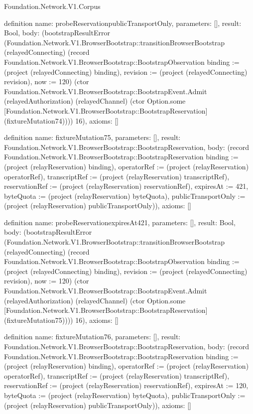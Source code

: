 \begin{lexlean}{Foundation.Network.V1.Corpus}
\begin{semanticmodule}
definition{
  name: probeReservationpublicTransportOnly,
  parameters: [],
  result: Bool,
  body: (bootstrapResultError (Foundation.Network.V1.BrowserBootstrap::transitionBrowserBootstrap (relayedConnecting) (record Foundation.Network.V1.BrowserBootstrap::BootstrapObservation {binding := (project (relayedConnecting) binding), revision := (project (relayedConnecting) revision), now := 120}) (ctor Foundation.Network.V1.BrowserBootstrap::BootstrapEvent.Admit (relayedAuthorization) (relayedChannel) (ctor Option.some [Foundation.Network.V1.BrowserBootstrap::BootstrapReservation] (fixtureMutation74)))) 16),
  axioms: []
}

definition{
  name: fixtureMutation75,
  parameters: [],
  result: Foundation.Network.V1.BrowserBootstrap::BootstrapReservation,
  body: (record Foundation.Network.V1.BrowserBootstrap::BootstrapReservation {binding := (project (relayReservation) binding), operatorRef := (project (relayReservation) operatorRef), transcriptRef := (project (relayReservation) transcriptRef), reservationRef := (project (relayReservation) reservationRef), expiresAt := 421, byteQuota := (project (relayReservation) byteQuota), publicTransportOnly := (project (relayReservation) publicTransportOnly)}),
  axioms: []
}

definition{
  name: probeReservationexpiresAt421,
  parameters: [],
  result: Bool,
  body: (bootstrapResultError (Foundation.Network.V1.BrowserBootstrap::transitionBrowserBootstrap (relayedConnecting) (record Foundation.Network.V1.BrowserBootstrap::BootstrapObservation {binding := (project (relayedConnecting) binding), revision := (project (relayedConnecting) revision), now := 120}) (ctor Foundation.Network.V1.BrowserBootstrap::BootstrapEvent.Admit (relayedAuthorization) (relayedChannel) (ctor Option.some [Foundation.Network.V1.BrowserBootstrap::BootstrapReservation] (fixtureMutation75)))) 16),
  axioms: []
}

definition{
  name: fixtureMutation76,
  parameters: [],
  result: Foundation.Network.V1.BrowserBootstrap::BootstrapReservation,
  body: (record Foundation.Network.V1.BrowserBootstrap::BootstrapReservation {binding := (project (relayReservation) binding), operatorRef := (project (relayReservation) operatorRef), transcriptRef := (project (relayReservation) transcriptRef), reservationRef := (project (relayReservation) reservationRef), expiresAt := 120, byteQuota := (project (relayReservation) byteQuota), publicTransportOnly := (project (relayReservation) publicTransportOnly)}),
  axioms: []
}


\end{semanticmodule}
\end{lexlean}
